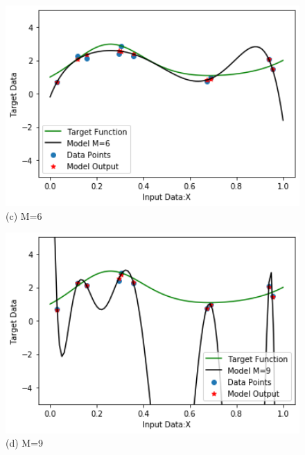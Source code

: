 \documentclass[a4 paper]{article}
\begin{document}
\begin{figure}[!htb]
    \centering
    \begin{minipage}{0.49\textwidth}
        \centering
        \includegraphics[width=1\textwidth]{M=6.png} \\
        (c) M=6
    \end{minipage}\hfill
    \begin{minipage}{0.49\textwidth}
        \centering
        \includegraphics[width=1\textwidth]{M=9.png}\\
        (d) M=9
    \end{minipage}
    \label{fig:l}
\end{figure}
\end{document}
